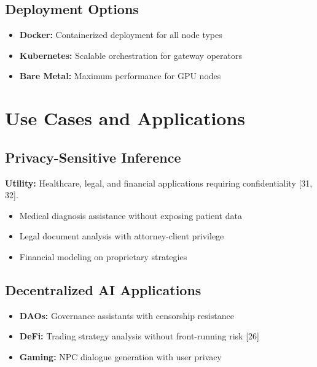 \documentclass[11pt,a4paper]{article}
\begin{document}
\subsection{Deployment Options}

\begin{itemize}
    \item \textbf{Docker:} Containerized deployment for all node types
    \item \textbf{Kubernetes:} Scalable orchestration for gateway operators
    \item \textbf{Bare Metal:} Maximum performance for GPU nodes
\end{itemize}

\section{Use Cases and Applications}

\subsection{Privacy-Sensitive Inference}

\textbf{Utility:} Healthcare, legal, and financial applications requiring confidentiality [31, 32].

\begin{itemize}
    \item Medical diagnosis assistance without exposing patient data
    \item Legal document analysis with attorney-client privilege
    \item Financial modeling on proprietary strategies
\end{itemize}

\subsection{Decentralized AI Applications}

\begin{itemize}
    \item \textbf{DAOs:} Governance assistants with censorship resistance
    \item \textbf{DeFi:} Trading strategy analysis without front-running risk [26]
    \item \textbf{Gaming:} NPC dialogue generation with user privacy
\end{itemize}
\end{document}
